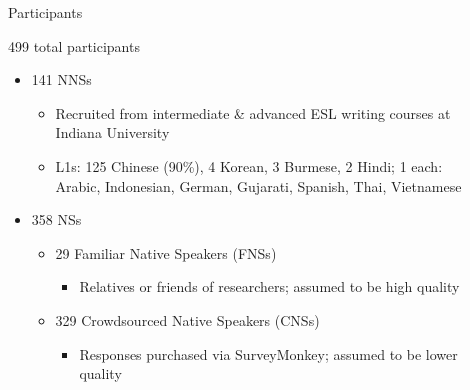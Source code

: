 \documentclass[final,t]{beamer}
\begin{document}
\begin{frame}{}
\begin{columns}[t]
\begin{column}{.33\linewidth}
\begin{block}{Participants}
\begin{center}
\begin{minipage}{.85\textwidth}
499 total participants
	\begin{itemize}
		\item 141 NNSs
		\begin{itemize}
			\item Recruited from intermediate \& advanced ESL writing courses at Indiana University
			\item L1s: 125 Chinese (90\%), 4 Korean, 3 Burmese, 2 Hindi; 1 each: Arabic, Indonesian, German, Gujarati, Spanish, Thai, Vietnamese
		\end{itemize}
		\item 358 NSs
		\begin{itemize}
			\item 29 Familiar Native Speakers (FNSs)
			\begin{itemize}
				\item Relatives or friends of researchers; assumed to be high quality
			\end{itemize}
			\item 329 Crowdsourced Native Speakers (CNSs)
			\begin{itemize}
				\item Responses purchased via SurveyMonkey; assumed to be lower quality
			\end{itemize}
		\end{itemize}
	\end{itemize}
\end{minipage}
\end{center}
\vspace{-.5em}
\end{block}
\end{column}

\begin{column}{.33\linewidth}


\end{column}
\end{columns}
\end{frame}
\end{document}
